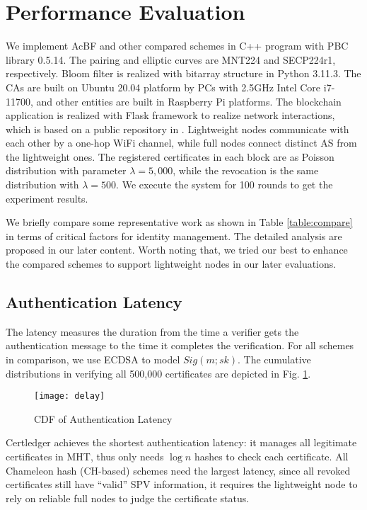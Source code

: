 \documentclass[conference]{IEEEtran}
\begin{document}
\section{Performance Evaluation} \label{sec:efficiency}
We implement AcBF and other compared schemes in C++ program with PBC library 0.5.14. The pairing and elliptic curves are MNT224 and SECP224r1, respectively. Bloom filter is realized with bitarray structure in Python 3.11.3. The CAs are built on Ubuntu 20.04 platform by PCs with 2.5GHz Intel Core i7-11700, and other entities are built in Raspberry Pi platforms. The blockchain application is realized with Flask framework to realize network interactions, which is based on a public repository in \cite{implement}. 
Lightweight nodes communicate with each other by a one-hop WiFi channel, while full nodes connect distinct AS from the lightweight ones. The registered certificates in each block are as Poisson distribution with parameter $\lambda = 5, 000$, while the revocation is the same distribution with $\lambda = 500$. We execute the system for 100 rounds to get the experiment results.

We briefly compare some representative work as shown in Table \ref{table:compare} in terms of critical factors for identity management. The detailed analysis are proposed in our later content. %
Worth noting that, we tried our best to enhance the compared schemes to support lightweight nodes in our later evaluations. 

\subsection{Authentication Latency}\label{sec:authentication latency}

The latency measures the duration from the time a verifier gets the authentication message to the time it completes the verification. For all schemes in comparison, we use ECDSA to model $Sig(m; sk)$. The cumulative distributions in verifying all 500,000 certificates are depicted in Fig. \ref{fig:cdf}. 

\begin{figure}[t]
	\centering
	\texttt{[image: delay]}
	\caption{CDF of Authentication Latency}
	\label{fig:cdf}
\end{figure}

Certledger \cite{certledger} achieves the shortest authentication latency: it manages all legitimate certificates in MHT, thus only needs $\log n$ hashes to check each certificate. All Chameleon hash (CH-based) schemes \cite{luoScalaCertScalabilityOrientedPKI2022a,jia2021process} need the largest latency, since all revoked certificates still have ``valid'' SPV information, it requires the lightweight node to rely on reliable full nodes to judge the certificate status. 
\end{document}
